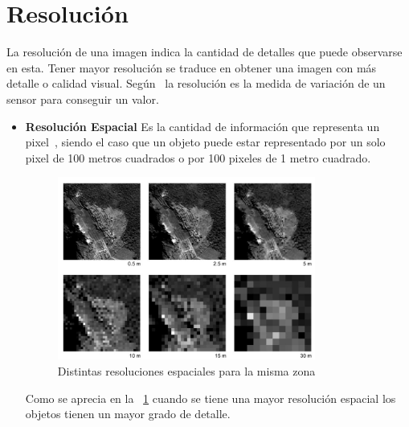 \section{Resolución} 
La resolución de una imagen indica la cantidad de detalles que puede observarse en esta. Tener mayor resolución se traduce en obtener una imagen con más detalle o calidad visual. Según~\cite{Wulder1998} la resolución es la medida de variación de un sensor para conseguir un valor.
\begin{itemize}
 \item \textbf{Resolución Espacial}\newline
Es la cantidad de información que representa un pixel~\cite{Wulder1998}, siendo el caso que un objeto puede estar representado por un solo pixel de 100 metros cuadrados o por 100 pixeles de 1 metro cuadrado. 
\begin{figure}[H]
    \centering
    \includegraphics[width = 0.8\textwidth]{images/02theory/espacial.png}
    \caption{Distintas resoluciones espaciales para la misma zona}
    \label{fig:resolucionEspacial}
\end{figure}

Como se aprecia en la \figurename~\ref{fig:resolucionEspacial} cuando se tiene una mayor resolución espacial los objetos tienen un mayor grado de detalle.



\end{itemize}

